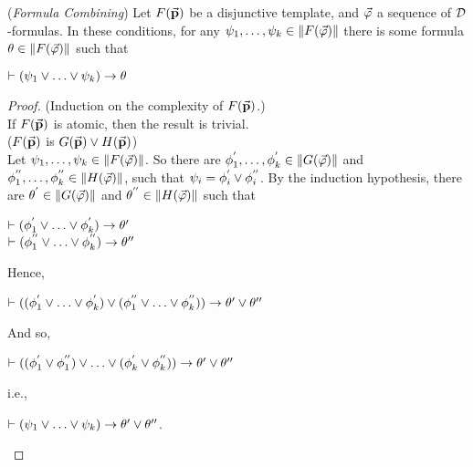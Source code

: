 \begin{pro}(\textit{Formula Combining}) Let $F(\vec{\textbf{p}})$ be a disjunctive template, and $\vec{\varphi}$ a sequence of $\mathcal{D}$-formulas. In these conditions, for any $\psi_{1}, \dots, \psi_{k}  \in \Arrowvert F(\vec{\varphi}) \Arrowvert$ there is some formula $\theta \in \Arrowvert F(\vec{\varphi}) \Arrowvert$ such that
	
	
	\begin{center}
		$\teo (\psi_{1} \ou \dots \ou \psi_{k}) \impli \theta$
	\end{center}    
\end{pro}

\begin{proof} (Induction on the complexity of $F(\vec{\textbf{p}})$.)\\
	
	\qquad If $F(\vec{\textbf{p}})$ is atomic, then the result is trivial.\\
	

	
	($F(\vec{\textbf{p}})$ is $G(\vec{\textbf{p}})\vee H(\vec{\textbf{p}})$)\\
	
	\qquad Let $\psi_{1}, \dots, \psi_{k} \in \Arrowvert F(\vec{\varphi}) \Arrowvert$. So there are $\phi_{1}^{^{\prime}}, \dots, \phi_{k}^{^{\prime}} \in \Arrowvert G(\vec{\varphi}) \Arrowvert$ and  $\phi_{1}^{^{\prime\prime}}, \dots, \phi_{k}^{^{\prime\prime}} \in \Arrowvert H(\vec{\varphi}) \Arrowvert$, such that $\psi_{i} = \phi_{i}^{^{\prime}} \vee \phi_{i}^{^{\prime\prime}}$. By the induction hypothesis, there are $\theta^{^{\prime}} \in \Arrowvert G(\vec{\varphi}) \Arrowvert$ and $\theta^{^{\prime\prime}} \in \Arrowvert H(\vec{\varphi}) \Arrowvert$ such that  
	
	
	\begin{center}
		$\teo (\phi_{1}^{\p} \ou \dots \ou \phi_{k}^{\p}) \impli \theta\p$\\
		$\teo (\phi_{1}^{\pp} \ou \dots \ou \phi_{k}^{\pp}) \impli \theta\pp$
	\end{center}
Hence, 
	
	
	\begin{center}
		$\teo ((\phi_{1}^{\p} \ou \dots \ou \phi_{k}^{\p}) \ou (\phi_{1}^{\pp} \ou \dots \ou \phi_{k}^{\pp})) \impli \theta\p \ou \theta\pp$
	\end{center}
And so, 
	
	\begin{center}
		$\teo ((\phi_{1}^{\p} \ou \phi_{1}^{\pp})  \ou \dots \ou (\phi_{k}^{\p} \ou \phi_{k}^{\pp}))  \impli \theta\p \ou \theta\pp$
	\end{center}
i.e.,
	
	\begin{center}
		$\teo (\psi_{1} \ou \dots \ou \psi_{k}) \impli \theta\p \ou \theta\pp$.
	\end{center}
	

\end{proof}
